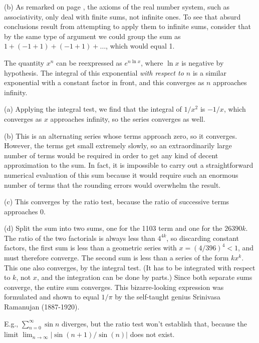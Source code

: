 (b) As remarked on page \pageref{infinite-sum-warning}, the axioms of the real number system, such as
associativity, only deal with finite sums, not infinite ones. To see that absurd conclusions result
from attempting to apply them to infinite sums, consider that by the same type of argument we could group
the sum as $1+(-1+1)+(-1+1)+\ldots$, which would equal 1.


The quantity $x^n$ can be reexpressed as $e^{n\ln x}$, where $\ln x$ is negative by hypothesis.
The integral of this exponential \emph{with respect to $n$} is a similar exponential with a constant
factor in front, and this converges as $n$ approaches infinity.


(a) Applying the integral test, we find that the integral of $1/x^2$ is $-1/x$, which converges as $x$ approaches infinity, so the series
converges as well.

(b) This is an alternating series whose terms approach zero, so it converges. However, the terms get small extremely
slowly, so an extraordinarily large number of terms would be required in order to get any kind of decent approximation
to the sum. In fact, it is impossible to carry out a straightforward numerical evaluation of this sum because it would
require such an enormous number of terms that the rounding errors would overwhelm the result.

(c) This converges by the ratio test, because the ratio of successive terms approaches 0.

(d) Split the sum into two sums, one for the 1103 term and one for the $26390k$. The ratio of the two factorials is always less than $4^{4k}$, so
discarding constant factors, the first sum is less than a geometric series with $x=(4/396)^4<1$, and must therefore converge. The second sum is less than a series of the form $kx^k$.
This one also converges, by the integral test. (It has to be integrated with respect to $k$, not $x$, and the integration can be done by parts.) Since both separate sums converge,
the entire sum converges. This bizarre-looking expression was formulated and shown to equal $1/\pi$ by the self-taught genius Srinivasa Ramanujan (1887-1920).

E.g., $\sum_{n=0}^\infty \sin n$ diverges, but the ratio test won't establish that, because
the limit $\lim_{n\rightarrow\infty}|\sin(n+1)/\sin(n)|$ does not exist.

